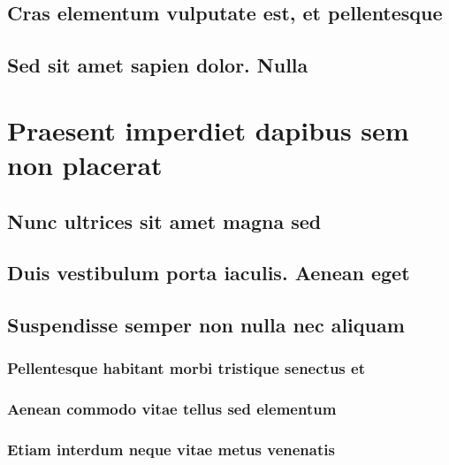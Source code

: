 \documentclass[%
  german,%
  exercise,%
  oneside,%
]{iswartcl}
\begin{document}
\lipsum[1-8]

\subsection{Cras elementum vulputate est, et pellentesque}

\lipsum[1-8]

\subsection{Sed sit amet sapien dolor. Nulla}

\lipsum[1-8]

\section{Praesent imperdiet dapibus sem non placerat}

\lipsum[1-8]

\subsection{Nunc ultrices sit amet magna sed}

\lipsum[1-8]

\subsection{Duis vestibulum porta iaculis. Aenean eget}

\lipsum[1-8]

\subsection{Suspendisse semper non nulla nec aliquam}

\lipsum[1-8]

\subsubsection{Pellentesque habitant morbi tristique senectus et}

\lipsum[1-8]

\subsubsection{Aenean commodo vitae tellus sed elementum}

\lipsum[1-8]

\subsubsection{Etiam interdum neque vitae metus venenatis}
\end{document}

